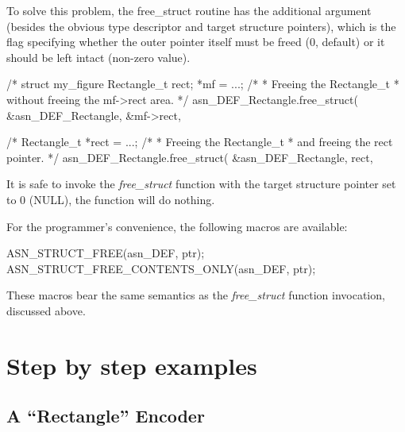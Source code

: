 \documentclass[english,oneside,12pt]{book}
\begin{document}
To solve this problem, the free\_struct routine has the additional
argument (besides the obvious type descriptor and target structure
pointers), which is the flag specifying whether the outer pointer
itself must be freed (0, default) or it should be left intact (non-zero
value).
\begin{codesample}
/* %
struct my_figure {
    Rectangle_t rect;
} *mf = ...;
/*
 * Freeing the Rectangle_t
 * without freeing the mf->rect area.
 */
asn_DEF_Rectangle.free_struct(
    &asn_DEF_Rectangle, &mf->rect, %
  
/* %
Rectangle_t *rect = ...;
/*
 * Freeing the Rectangle_t
 * and freeing the rect pointer.
 */
asn_DEF_Rectangle.free_struct(
    &asn_DEF_Rectangle, rect, %
\end{codesample}
It is safe to invoke the \emph{free\_struct} function with the target
structure pointer set to 0 (NULL), the function will do nothing.

For the programmer's convenience, the following macros are available:
\begin{codesample}
ASN_STRUCT_FREE(asn_DEF, ptr);
ASN_STRUCT_FREE_CONTENTS_ONLY(asn_DEF, ptr);
\end{codesample}
These macros bear the same semantics as the \emph{free\_struct} function
invocation, discussed above.


\chapter{\label{cha:Step-by-step-examples}Step by step examples}


\section{A ``Rectangle'' Encoder}
\end{document}
